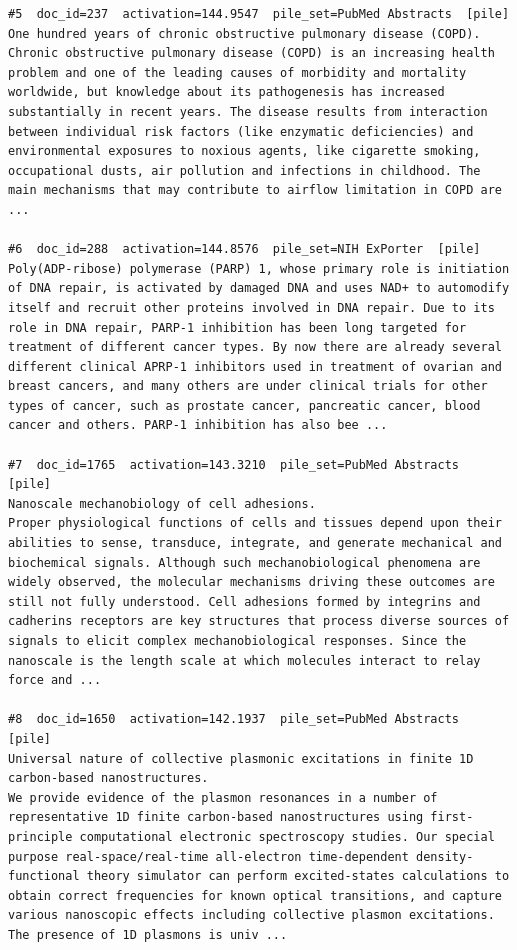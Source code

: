 \begin{verbatim}
#5  doc_id=237  activation=144.9547  pile_set=PubMed Abstracts  [pile]
One hundred years of chronic obstructive pulmonary disease (COPD).
Chronic obstructive pulmonary disease (COPD) is an increasing health problem and one of the leading causes of morbidity and mortality worldwide, but knowledge about its pathogenesis has increased substantially in recent years. The disease results from interaction between individual risk factors (like enzymatic deficiencies) and environmental exposures to noxious agents, like cigarette smoking, occupational dusts, air pollution and infections in childhood. The main mechanisms that may contribute to airflow limitation in COPD are ...

#6  doc_id=288  activation=144.8576  pile_set=NIH ExPorter  [pile]
Poly(ADP-ribose) polymerase (PARP) 1, whose primary role is initiation of DNA repair, is activated by damaged DNA and uses NAD+ to automodify itself and recruit other proteins involved in DNA repair. Due to its role in DNA repair, PARP-1 inhibition has been long targeted for treatment of different cancer types. By now there are already several different clinical APRP-1 inhibitors used in treatment of ovarian and breast cancers, and many others are under clinical trials for other types of cancer, such as prostate cancer, pancreatic cancer, blood cancer and others. PARP-1 inhibition has also bee ...

#7  doc_id=1765  activation=143.3210  pile_set=PubMed Abstracts  [pile]
Nanoscale mechanobiology of cell adhesions.
Proper physiological functions of cells and tissues depend upon their abilities to sense, transduce, integrate, and generate mechanical and biochemical signals. Although such mechanobiological phenomena are widely observed, the molecular mechanisms driving these outcomes are still not fully understood. Cell adhesions formed by integrins and cadherins receptors are key structures that process diverse sources of signals to elicit complex mechanobiological responses. Since the nanoscale is the length scale at which molecules interact to relay force and ...

#8  doc_id=1650  activation=142.1937  pile_set=PubMed Abstracts  [pile]
Universal nature of collective plasmonic excitations in finite 1D carbon-based nanostructures.
We provide evidence of the plasmon resonances in a number of representative 1D finite carbon-based nanostructures using first-principle computational electronic spectroscopy studies. Our special purpose real-space/real-time all-electron time-dependent density-functional theory simulator can perform excited-states calculations to obtain correct frequencies for known optical transitions, and capture various nanoscopic effects including collective plasmon excitations. The presence of 1D plasmons is univ ...


\end{verbatim}
